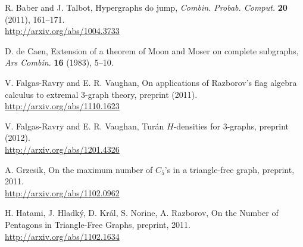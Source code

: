 \documentclass{article}
\begin{document}
\begin{thebibliography}{10}

 R. Baber and J. Talbot, Hypergraphs do jump, \emph{Combin. Probab. Comput.} \textbf{20} (2011), 161--171. \\ %
\url{http://arxiv.org/abs/1004.3733}

 D. de Caen, Extension of a theorem of Moon and Moser on complete subgraphs, \emph{Ars Combin.} \textbf{16} (1983), 5--10.


 V. Falgas-Ravry and E. R. Vaughan, On applications of Razborov's flag algebra calculus to extremal 3-graph theory, preprint (2011). \\
\url{http://arxiv.org/abs/1110.1623}

 V. Falgas-Ravry and E. R. Vaughan, Turán $H$-densities for 3-graphs, preprint (2012). \\
\url{http://arxiv.org/abs/1201.4326}



 A. Grzesik, On the maximum number of $C_5$'s in a triangle-free graph, preprint, 2011. \\ \url{http://arxiv.org/abs/1102.0962}

 H. Hatami, J. Hladký, D. Král, S. Norine, A. Razborov, On the Number of Pentagons in Triangle-Free Graphs, preprint, 2011. \\
\url{http://arxiv.org/abs/1102.1634}


\end{thebibliography}
\end{document}
